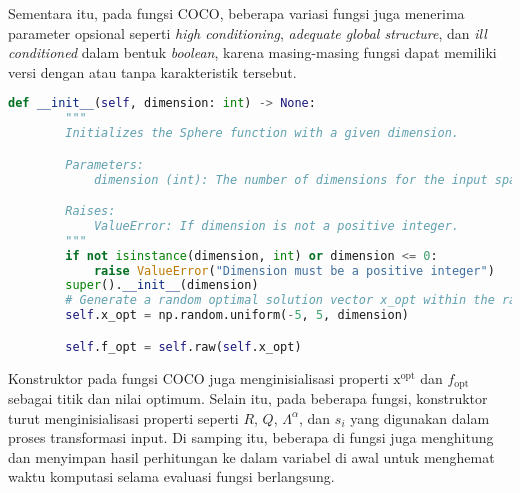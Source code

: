 Sementara itu, pada fungsi COCO, beberapa variasi fungsi juga menerima parameter opsional seperti \textit{high conditioning}, \textit{adequate global structure}, dan \textit{ill conditioned} dalam bentuk \textit{boolean}, karena masing-masing fungsi dapat memiliki versi dengan atau tanpa karakteristik tersebut.
\begin{lstlisting}[language=Python, caption=kontruktor kelas fungsi COCO, label=lst:init_cec]
    def __init__(self, dimension: int) -> None:
        """
        Initializes the Sphere function with a given dimension.

        Parameters:
            dimension (int): The number of dimensions for the input space. Must be a positive integer.

        Raises:
            ValueError: If dimension is not a positive integer.
        """
        if not isinstance(dimension, int) or dimension <= 0:
            raise ValueError("Dimension must be a positive integer")
        super().__init__(dimension)
        # Generate a random optimal solution vector x_opt within the range [-5, 5]
        self.x_opt = np.random.uniform(-5, 5, dimension)

        self.f_opt = self.raw(self.x_opt)
\end{lstlisting}
Konstruktor pada fungsi COCO juga menginisialisasi properti $\mathrm{x}^{\text{opt}}$ dan $f_{\text{opt}}$ sebagai titik dan nilai optimum. Selain itu, pada beberapa fungsi, konstruktor turut menginisialisasi properti seperti $R$, $Q$, $\Lambda^{\alpha}$, dan $s_i$ yang digunakan dalam proses transformasi input. Di samping itu, beberapa di fungsi juga menghitung dan menyimpan hasil perhitungan ke dalam variabel di awal untuk menghemat waktu komputasi selama evaluasi fungsi berlangsung.
